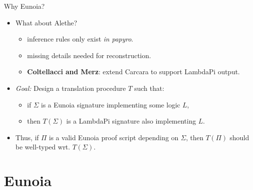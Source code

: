 \documentclass[lualatex, compress, 12pt, handout]{beamer}
\begin{document}
\begin{frame}{Why Eunoia?}
	\begin{itemize}
		\item<+-> What about Alethe?
		      \begin{itemize}
			      \item<+-> inference rules only exist \emph{in papyro}.
			      \item<+-> missing details needed for reconstruction.
			      \item<+->
			            \textbf{Coltellacci and Merz}: extend \alert{Carcara}
			            to support LambdaPi output.
		      \end{itemize}
	\end{itemize}
\end{frame}

\begin{frame}{}
	\begin{itemize}
		\item<+-> \emph{\color{oc-green-9}Goal:}
		      Design a translation procedure $T$ such that:
		      \begin{itemize}
			      \item<+-> if $Σ$ is a Eunoia signature implementing some \alert{logic} $L$,
			      \item<+-> then $T(Σ)$ is a LambdaPi signature also implementing $L$.
			            \\[2mm]
		      \end{itemize}

		\item<+-> Thus, if $Π$ is a valid Eunoia \alert{proof script} depending on $Σ$,
		      then $T(Π)$ should be \alert{well-typed} wrt. $T(Σ)$.
	\end{itemize}
\end{frame}

\section{Eunoia}
\end{document}
